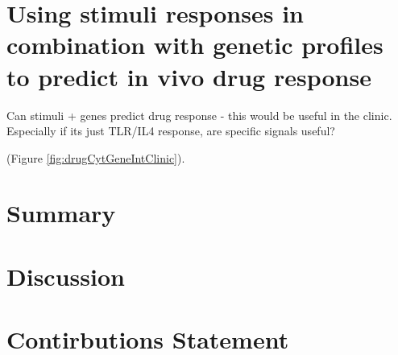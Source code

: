 \documentclass[11pt, a4paper, twosided]{book}
\begin{document}
\hypertarget{using-stimuli-responses-in-combination-with-genetic-profiles-to-predict-in-vivo-drug-response}{%
\section{Using stimuli responses in combination with genetic profiles to predict in vivo drug response}\label{using-stimuli-responses-in-combination-with-genetic-profiles-to-predict-in-vivo-drug-response}}

Can stimuli + genes predict drug response - this would be useful in the clinic. Especially if its just TLR/IL4 response, are specific signals useful?

(Figure \ref{fig:drugCytGeneIntClinic}).



\hypertarget{summary-2}{%
\section{Summary}\label{summary-2}}

\hypertarget{discussion-2}{%
\section{Discussion}\label{discussion-2}}

\hypertarget{contirbutions-statement}{%
\section{Contirbutions Statement}\label{contirbutions-statement}}
\end{document}
